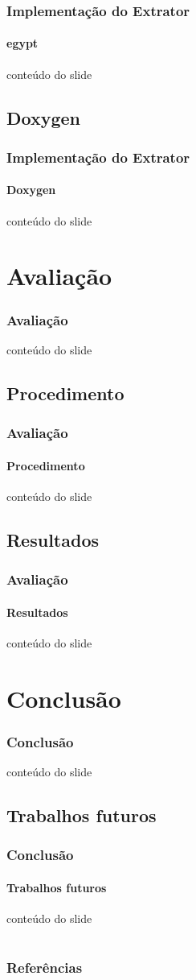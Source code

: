 \documentclass{beamer}
\begin{document}
\begin{frame}
\frametitle{Implementação do Extrator}
\framesubtitle{egypt}
 conteúdo do slide
\end{frame}

\subsection{Doxygen}

\begin{frame}
\frametitle{Implementação do Extrator}
\framesubtitle{Doxygen}
 conteúdo do slide
\end{frame}

\section{Avaliação}

\begin{frame}
\frametitle{Avaliação}
 conteúdo do slide
\end{frame}

\subsection{Procedimento}

\begin{frame}
\frametitle{Avaliação}
\framesubtitle{Procedimento}
 conteúdo do slide
\end{frame}

\subsection{Resultados}

\begin{frame}
\frametitle{Avaliação}
\framesubtitle{Resultados}
 conteúdo do slide
\end{frame}

\section{Conclusão}

\begin{frame}
\frametitle{Conclusão}
 conteúdo do slide
\end{frame}

\subsection{Trabalhos futuros}

\begin{frame}
\frametitle{Conclusão}
\framesubtitle{Trabalhos futuros}
 conteúdo do slide\cite{measuringCouplingAndCohesion}
\end{frame}

\section{}

\begin{frame}
\frametitle{Referências}

{}
\end{frame}
\end{document}
